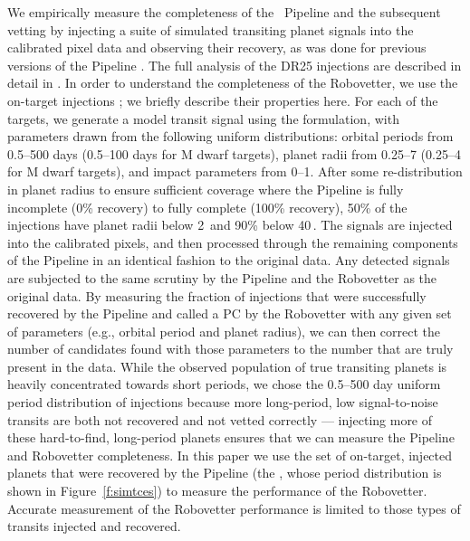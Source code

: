 We empirically measure the completeness of the \Kepler\ Pipeline and the subsequent vetting by injecting a suite of simulated transiting planet signals into the calibrated pixel data and observing their recovery, as was done for previous versions of the \Kepler{} Pipeline \citep{Christiansen2013a,Christiansen2015,Christiansen2016}. The full analysis of the DR25 injections are described in detail in \citet{Christiansen2017}. In order to understand the completeness of the Robovetter, we use the on-target injections \citep[Group 1 in][]{Christiansen2017}; we briefly describe their properties here. For each of the \ninjecttargs{} targets, we generate a model transit signal using the \citet{Mandel2002} formulation, with parameters drawn from the following uniform distributions: orbital periods from 0.5--500 days (0.5--100 days for M dwarf targets), planet radii from 0.25--7 \re{} (0.25--4 \re{} for M dwarf targets), and impact parameters from 0--1. After some re-distribution in planet radius to ensure sufficient coverage where the \Kepler{} Pipeline is fully incomplete (0\% recovery) to fully complete (100\% recovery), 50\% of the injections have planet radii below 2\,\re{} and 90\% below 40\,\re{}. The signals are injected into the calibrated pixels, and then processed through the remaining components of the \Kepler{} Pipeline in an identical fashion to the original data. Any detected signals are subjected to the same scrutiny by the Pipeline and the Robovetter as the original data. By measuring the fraction of injections that were successfully recovered by the Pipeline and called a PC by the Robovetter with any given set of parameters (e.g., orbital period and planet radius), we can then correct the number of candidates found with those parameters to the number that are truly present in the data. While the observed population of true transiting planets is heavily concentrated towards short periods, we chose the 0.5--500 day uniform period distribution of injections because more long-period, low signal-to-noise transits are both not recovered and not vetted correctly --- injecting more of these hard-to-find, long-period planets ensures that we can measure the Pipeline and Robovetter completeness. In this paper we use the set of on-target, injected planets that were recovered by the \Kepler{} Pipeline (the , whose period distribution is shown in Figure~\ref{f:simtces}) to measure the performance of the Robovetter. Accurate measurement of the Robovetter performance is limited to those types of transits injected and recovered.

